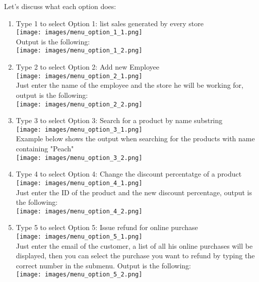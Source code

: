 \documentclass[a4paper,11pt]{article}
\begin{document}
\noindent
Let's discuss what each option does:
\begin{enumerate}[label=-]
    \item Type 1 to select Option 1: list sales generated by every store\\
        \texttt{[image: images/menu\_option\_1\_1.png]}\\
        Output is the following:\\
        \texttt{[image: images/menu\_option\_1\_2.png]}
    \item Type 2 to select Option 2: Add new Employee\\
        \texttt{[image: images/menu\_option\_2\_1.png]}\\
        Just enter the name of the employee and the store he will be working
        for, output is the following:\\
        \texttt{[image: images/menu\_option\_2\_2.png]}
    \item Type 3 to select Option 3: Search for a product by name substring\\
        \texttt{[image: images/menu\_option\_3\_1.png]}\\
        Example below shows the output when searching for the products with
        name containing "Peach"\\
        \texttt{[image: images/menu\_option\_3\_2.png]}
    \item Type 4 to select Option 4: Change the discount percentatge of a product\\
        \texttt{[image: images/menu\_option\_4\_1.png]}\\
        Just enter the ID of the product and the new discount percentage,
        output is the following:\\
        \texttt{[image: images/menu\_option\_4\_2.png]}
    \item Type 5 to select Option 5: Issue refund for online purchase\\
        \texttt{[image: images/menu\_option\_5\_1.png]}\\
        Just enter the email of the customer, a list of all his online purchases
        will be displayed, then you can select the purchase you want to refund
        by typing the correct number in the submenu. Output is the following:\\
        \texttt{[image: images/menu\_option\_5\_2.png]}

\end{enumerate}
\end{document}
